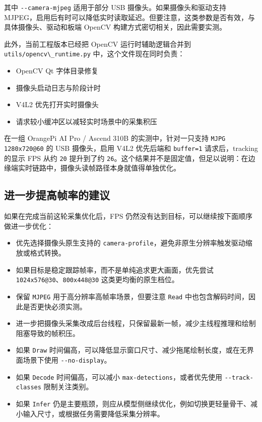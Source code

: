 其中 \passthrough{\lstinline!--camera-mjpeg!} 适用于部分 USB
摄像头。如果摄像头和驱动支持
MJPEG，启用后有时可以降低实时读取延迟。但要注意，这类参数是否有效，与具体摄像头、驱动和板端
OpenCV 构建方式密切相关，因此需要实测。

此外，当前工程版本已经把 OpenCV 运行时辅助逻辑合并到
\passthrough{\lstinline!utils/opencv\_runtime.py!}
中，这个文件现在同时负责：

\begin{itemize}
\tightlist
\item
  OpenCV Qt 字体目录修复
\item
  摄像头启动日志与阶段计时
\item
  V4L2 优先打开实时摄像头
\item
  请求较小缓冲区以减轻实时场景中的采集积压
\end{itemize}

在一组 OrangePi AI Pro / Ascend 310B 的实测中，针对一只支持
\passthrough{\lstinline!MJPG 1280x720@60!} 的 USB 摄像头，启用 V4L2
优先后端和 \passthrough{\lstinline!buffer=1!} 请求后，tracking 的显示
FPS 从约 \passthrough{\lstinline!20!} 提升到了约
\passthrough{\lstinline!26!}。这个结果并不是固定值，但足以说明：在边缘端实时链路中，摄像头读帧路径本身就值得单独优化。

\subsection{进一步提高帧率的建议}\label{src-experiment-case2-h79}

如果在完成当前这轮采集优化后，FPS
仍然没有达到目标，可以继续按下面顺序做进一步优化：

\begin{itemize}
\tightlist
\item
  优先选择摄像头原生支持的
  \passthrough{\lstinline!camera-profile!}，避免非原生分辨率触发驱动缩放或格式转换。
\item
  如果目标是稳定跟踪帧率，而不是单纯追求更大画面，优先尝试
  \passthrough{\lstinline!1024x576@30!}、\passthrough{\lstinline!800x448@30!}
  这类更均衡的原生档位。
\item
  保留 \passthrough{\lstinline!MJPEG!} 用于高分辨率高帧率场景，但要注意
  \passthrough{\lstinline!Read!}
  中也包含解码时间，因此是否更快必须实测。
\item
  进一步把摄像头采集改成后台线程，只保留最新一帧，减少主线程推理和绘制阻塞导致的帧积压。
\item
  如果 \passthrough{\lstinline!Draw!}
  时间偏高，可以降低显示窗口尺寸、减少拖尾绘制长度，或在无界面场景下使用
  \passthrough{\lstinline!--no-display!}。
\item
  如果 \passthrough{\lstinline!Decode!} 时间偏高，可以减小
  \passthrough{\lstinline!max-detections!}，或者优先使用
  \passthrough{\lstinline!--track-classes!} 限制关注类别。
\item
  如果 \passthrough{\lstinline!Infer!}
  仍是主要瓶颈，则应从模型侧继续优化，例如切换更轻量骨干、减小输入尺寸，或根据任务需要降低采集分辨率。
\end{itemize}

